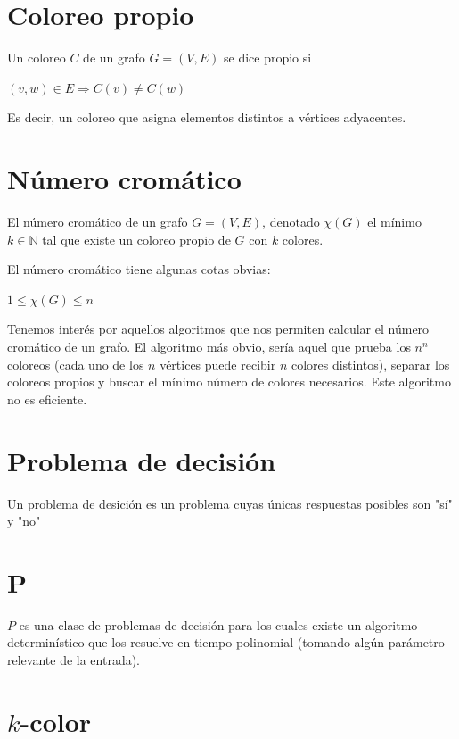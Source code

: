 \documentclass[10pt,a4paper]{article}
\begin{document}
\section*{Coloreo propio}

Un coloreo $C$ de un grafo $G=(V, E)$ se dice propio si

\begin{center}
$(v, w) \in E \Rightarrow C(v) \neq C(w)$
\end{center}

Es decir, un coloreo que asigna elementos distintos a vértices adyacentes.

\section*{Número cromático}

El número cromático de un grafo $G = (V, E)$, denotado $\chi(G)$ el mínimo $k \in \mathbb{N}$ tal que existe un coloreo propio de $G$ con $k$ colores.

El número cromático tiene algunas cotas obvias:

\begin{center}
$1 \leq \chi(G)\leq n$
\end{center}

Tenemos interés por aquellos algoritmos que nos permiten calcular el número cromático de un grafo. El algoritmo más obvio, sería aquel que prueba los $n^n$ coloreos (cada uno de los $n$ vértices puede recibir $n$ colores distintos), separar los coloreos propios y buscar el mínimo número de colores necesarios. Este algoritmo no es eficiente.

\section*{Problema de decisión}

Un problema de desición es un problema cuyas únicas respuestas posibles son "sí" y "no"

\section*{P}

$P$ es una clase de problemas de decisión para los cuales existe un algoritmo determinístico que los resuelve en tiempo polinomial (tomando algún parámetro relevante de la entrada).

\section*{$k$-color}
\end{document}
